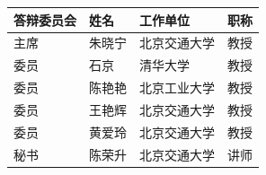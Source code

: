 
\begin{committee}
\renewcommand\arraystretch{2}

\begin{table}[!h]
\centering
\begin{tabular}{|p{2.6cm}<{\centering}|p{3cm}<{\centering}|p{5cm}<{\centering}|p{2.5cm}<{\centering}|}
\hline
\textbf{答辩委员会} & \textbf{姓名} & \textbf{工作单位} & \textbf{职称} \\
\hline
主席 & 朱晓宁 & 北京交通大学 & 教授 \\
\hline
委员 &  石京 &  清华大学 &  教授 \\
\hline
委员 &  陈艳艳 & 北京工业大学  & 教授  \\
\hline
委员 &  王艳辉 &  北京交通大学 &  教授 \\
\hline
委员 & 黄爱玲  &  北京交通大学 &  教授 \\
\hline
秘书 &  陈荣升 & 北京交通大学  &  讲师 \\
\hline
\end{tabular}	
\end{table}
\end{committee}